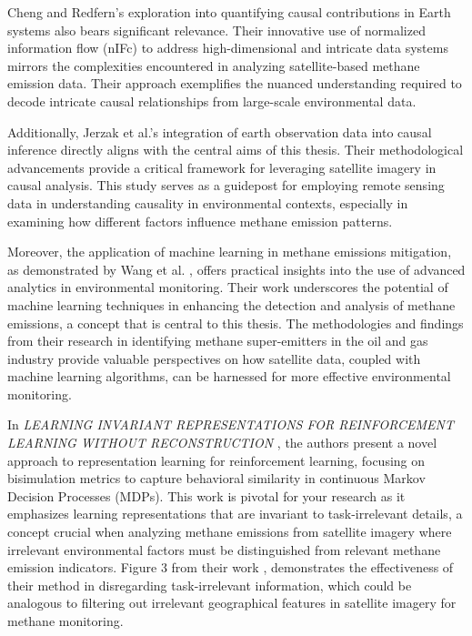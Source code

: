 Cheng and Redfern’s exploration into quantifying causal contributions in Earth systems \cite{cheng2021} also bears significant relevance. Their innovative use of normalized information flow (nIFc) to address high-dimensional and intricate data systems mirrors the complexities encountered in analyzing satellite-based methane emission data. Their approach exemplifies the nuanced understanding required to decode intricate causal relationships from large-scale environmental data.

Additionally, Jerzak et al.'s \cite{jerzak2023} integration of earth observation data into causal inference directly aligns with the central aims of this thesis. Their methodological advancements provide a critical framework for leveraging satellite imagery in causal analysis. This study serves as a guidepost for employing remote sensing data in understanding causality in environmental contexts, especially in examining how different factors influence methane emission patterns.

Moreover, the application of machine learning in methane emissions mitigation, as demonstrated by Wang et al. \cite{wang2020}, offers practical insights into the use of advanced analytics in environmental monitoring. Their work underscores the potential of machine learning techniques in enhancing the detection and analysis of methane emissions, a concept that is central to this thesis. The methodologies and findings from their research in identifying methane super-emitters in the oil and gas industry provide valuable perspectives on how satellite data, coupled with machine learning algorithms, can be harnessed for more effective environmental monitoring.


In \textit{LEARNING INVARIANT REPRESENTATIONS FOR REINFORCEMENT LEARNING WITHOUT RECONSTRUCTION} \cite{zhang_learning_2021}, the authors present a novel approach to representation learning for reinforcement learning, focusing on bisimulation metrics to capture behavioral similarity in continuous Markov Decision Processes (MDPs). This work is pivotal for your research as it emphasizes learning representations that are invariant to task-irrelevant details, a concept crucial when analyzing methane emissions from satellite imagery where irrelevant environmental factors must be distinguished from relevant methane emission indicators. Figure 3 from their work \cite[Figure 3]{zhang_learning_2021}, demonstrates the effectiveness of their method in disregarding task-irrelevant information, which could be analogous to filtering out irrelevant geographical features in satellite imagery for methane monitoring.


